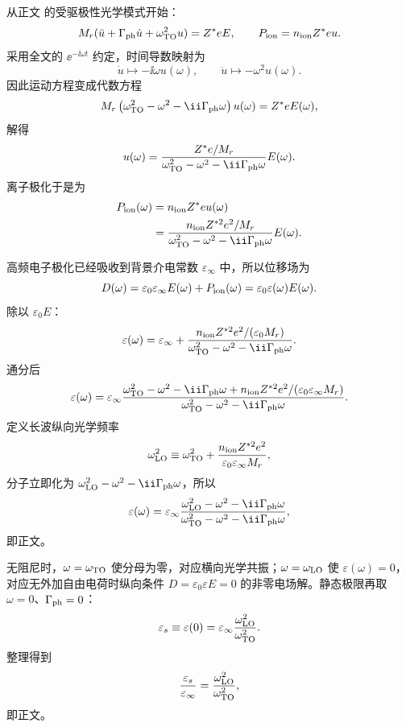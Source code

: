 \begin{derivation}[极性晶格的纵横光学频率关系]
从正文 的受驱极性光学模式开始：
\[
M_r(\ddot u+\Gamma_{\rm ph}\dot u+\omega_{\rm TO}^2u)=Z^*eE,
\qquad
P_{\rm ion}=n_{\rm ion}Z^*eu.
\]
采用全文的 $\ee^{-\ii\omega t}$ 约定，时间导数映射为
\[
\dot u\mapsto-\ii\omega u(\omega),
\qquad
\ddot u\mapsto-\omega^2u(\omega).
\]
因此运动方程变成代数方程
\[
M_r\left(\omega_{\rm TO}^2-\omega^2-\ii\Gamma_{\rm ph}\omega\right)u(\omega)
=Z^*eE(\omega),
\]
解得
\[
u(\omega)
=\frac{Z^*e/M_r}
{\omega_{\rm TO}^2-\omega^2-\ii\Gamma_{\rm ph}\omega}E(\omega).
\]
离子极化于是为
\begin{align*}
P_{\rm ion}(\omega)
&=n_{\rm ion}Z^*eu(\omega)\\
&=\frac{n_{\rm ion}Z^{*2}e^2/M_r}
{\omega_{\rm TO}^2-\omega^2-\ii\Gamma_{\rm ph}\omega}E(\omega).
\end{align*}

高频电子极化已经吸收到背景介电常数 $\varepsilon_\infty$ 中，所以位移场为
\[
D(\omega)=\varepsilon_0\varepsilon_\infty E(\omega)+P_{\rm ion}(\omega)
=\varepsilon_0\varepsilon(\omega)E(\omega).
\]
除以 $\varepsilon_0E$：
\[
\varepsilon(\omega)
=\varepsilon_\infty
+\frac{n_{\rm ion}Z^{*2}e^2/(\varepsilon_0M_r)}
{\omega_{\rm TO}^2-\omega^2-\ii\Gamma_{\rm ph}\omega}.
\]
通分后
\begin{align*}
\varepsilon(\omega)
=\varepsilon_\infty
\frac{\omega_{\rm TO}^2-\omega^2-\ii\Gamma_{\rm ph}\omega
+n_{\rm ion}Z^{*2}e^2/(\varepsilon_0\varepsilon_\infty M_r)}
{\omega_{\rm TO}^2-\omega^2-\ii\Gamma_{\rm ph}\omega}.
\end{align*}
定义长波纵向光学频率
\[
\omega_{\rm LO}^2
\equiv\omega_{\rm TO}^2
+\frac{n_{\rm ion}Z^{*2}e^2}
{\varepsilon_0\varepsilon_\infty M_r},
\]
分子立即化为
$\omega_{\rm LO}^2-\omega^2-\ii\Gamma_{\rm ph}\omega$，所以
\[
\varepsilon(\omega)
=\varepsilon_\infty
\frac{\omega_{\rm LO}^2-\omega^2-\ii\Gamma_{\rm ph}\omega}
{\omega_{\rm TO}^2-\omega^2-\ii\Gamma_{\rm ph}\omega},
\]
即正文。

无阻尼时，$\omega=\omega_{\rm TO}$ 使分母为零，对应横向光学共振；$\omega=\omega_{\rm LO}$ 使 $\varepsilon(\omega)=0$，对应无外加自由电荷时纵向条件
$D=\varepsilon_0\varepsilon E=0$ 的非零电场解。静态极限再取 $\omega=0$、$\Gamma_{\rm ph}=0$：
\[
\varepsilon_s\equiv\varepsilon(0)
=\varepsilon_\infty
\frac{\omega_{\rm LO}^2}{\omega_{\rm TO}^2}.
\]
整理得到
\[
\frac{\varepsilon_s}{\varepsilon_\infty}
=\frac{\omega_{\rm LO}^2}{\omega_{\rm TO}^2},
\]
即正文。
\end{derivation}

